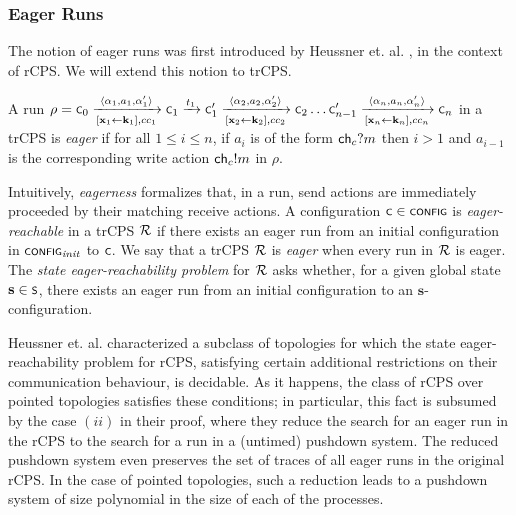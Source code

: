 \subsubsection{Eager Runs}\label{subsubsec:eagerness}
The notion of eager runs was first introduced by Heussner et. al. \cite{heussner2010reachability,heussner2012reachability}, in the context of rCPS. We will extend this notion to trCPS.

\begin{definition}
	A run $\rho = \scrsf{c}_0 \xrightarrow[{[\mathbf{x}_1 \leftarrow \mathbf{k}_1]}, cc_1]{\tup{\alpha_1,a_1,\alpha'_1}} \scrsf{c}_1 \xrightarrow{t_1} \scrsf{c}_1' \xrightarrow[{[\mathbf{x}_2 \leftarrow \mathbf{k}_2]}, cc_2]{\tup{\alpha_2,a_2,\alpha'_2}} \scrsf{c}_2 \ldots \scrsf{c}_{n-1}' \xrightarrow[{[\mathbf{x}_n \leftarrow \mathbf{k}_n]}, cc_n]{\tup{\alpha_n,a_n,\alpha'_n}} \scrsf{c}_n$ in a trCPS is \emph{eager} if for all $1 \leq i \leq n$, if $a_i$ is of the form $\ch_c?m$ then $i > 1$ and $a_{i - 1}$ is the corresponding write action $\ch_c!m$ in $\rho$. 
\end{definition}




Intuitively, \emph{eagerness} formalizes that, in a run, send actions are immediately proceeded by their matching receive actions. A configuration $\scrsf{c} \in \scrsf{config}$ is \emph{eager-reachable} in a trCPS $\cal R$ if there exists an eager run from an initial configuration in $\scrsf{config}_{\mathit{init}}$ to $\scrsf{c}$. We say that a trCPS $\cal R$ is \emph{eager} when every run in $\cal R$ is eager.
The \emph{state eager-reachability problem} for $\cal R$ asks whether, for a given global state $\mathbf{s} \in \scrsf{s}$, there exists an eager run from an initial configuration to an $\mathbf{s}$-configuration.

Heussner et. al. \cite[Prop. 2.4]{heussner2010reachability} characterized a subclass of topologies for which the state eager-reachability problem for rCPS, satisfying certain additional restrictions on their communication behaviour, is decidable. As it happens, the class of rCPS over pointed topologies satisfies these conditions; in particular, this fact is subsumed by the case $(ii)$ in their proof, where they reduce the search for an eager run in the rCPS to the search for a run in a (untimed) pushdown system. The reduced pushdown system even preserves the set of traces of all eager runs in the original rCPS. In the case of pointed topologies, such a reduction leads to a pushdown system of size polynomial in the size of each of the processes.

